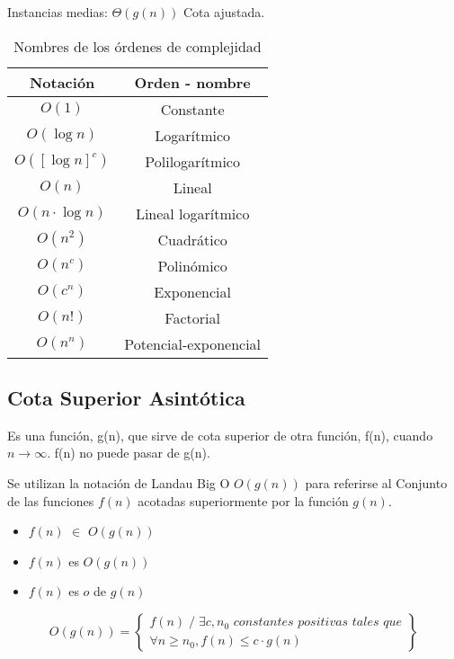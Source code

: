 Instancias medias: $\Theta(g(n))$ Cota ajustada.

\begin{table}[H]
  \begin{tabular}{|c|c|}
  \hline
  \rowcolor[HTML]{BFBFBF} 
  Notación                            & Orden - nombre                               \\ \hline
  $O(1)$                                & Constante                                    \\ \hline
  $O(\log n)$                            & Logarítmico                                  \\ \hline
  $O([\log n]^c)$                        & Polilogarítmico                              \\ \hline
  $O(n)$         & Lineal                \\ \hline
  $O(n \cdot \log n)$ & Lineal logarítmico    \\ \hline
  $O(n^2)$       & Cuadrático            \\ \hline
  $O(n^c)$       & Polinómico            \\ \hline
  $O(c^n)$       & Exponencial           \\ \hline
  $O(n!)$        & Factorial             \\ \hline
  $O(n^n)$       & Potencial-exponencial \\ \hline
  \end{tabular}
  \caption{Nombres de los órdenes de complejidad}
\end{table}

\subsection{Cota Superior Asintótica}
Es una función, g(n), que sirve de cota superior de otra función, f(n), cuando $n\rightarrow \infty$. f(n) no puede pasar de g(n).

Se utilizan la notación de Landau Big O $O(g(n))$ para referirse al Conjunto de las funciones $f(n)$ acotadas superiormente por la función $g(n)$.
\begin{itemize}
  \item $f(n)$ $\in$ $O(g(n))$
  \item $f(n)$ es $O(g(n))$
  \item $f(n)$ es $o$ de $g(n)$
\end{itemize}

$$O(g(n))=\left\{\begin{matrix}
  f(n)\;/\;\exists c, n_0 \textit{ constantes positivas tales que}  \\
  \forall n \geq n_0, f(n) \leq c \cdot g(n)
  \end{matrix}\right\}$$

